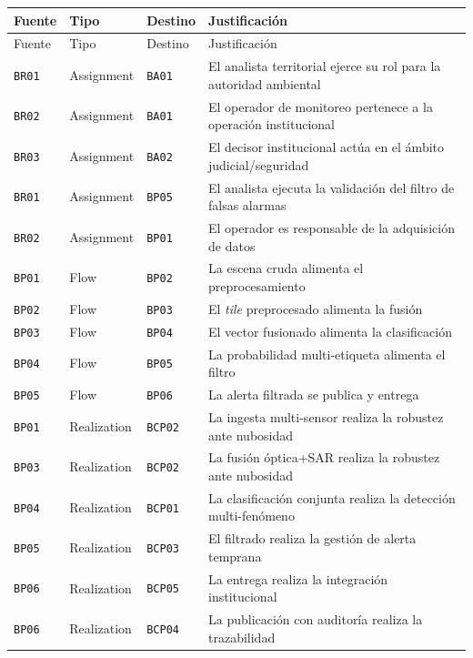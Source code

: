 \documentclass{article}
\begin{document}
{\small
\begin{longtable}{@{}L{0.45in}L{0.82in}L{0.53in}L{4.14in}@{}}
\toprule
Fuente & Tipo & Destino & Justificación \\
\midrule
\endfirsthead
\toprule
Fuente & Tipo & Destino & Justificación \\
\midrule
\endhead
\bottomrule
\endlastfoot
\texttt{BR01} & Assignment & \texttt{BA01} & El analista territorial ejerce su rol para la autoridad ambiental \\
\texttt{BR02} & Assignment & \texttt{BA01} & El operador de monitoreo pertenece a la operación institucional \\
\texttt{BR03} & Assignment & \texttt{BA02} & El decisor institucional actúa en el ámbito judicial/seguridad \\
\texttt{BR01} & Assignment & \texttt{BP05} & El analista ejecuta la validación del filtro de falsas alarmas \\
\texttt{BR02} & Assignment & \texttt{BP01} & El operador es responsable de la adquisición de datos \\
\texttt{BP01} & Flow & \texttt{BP02} & La escena cruda alimenta el preprocesamiento \\
\texttt{BP02} & Flow & \texttt{BP03} & El \emph{tile} preprocesado alimenta la fusión \\
\texttt{BP03} & Flow & \texttt{BP04} & El vector fusionado alimenta la clasificación \\
\texttt{BP04} & Flow & \texttt{BP05} & La probabilidad multi-etiqueta alimenta el filtro \\
\texttt{BP05} & Flow & \texttt{BP06} & La alerta filtrada se publica y entrega \\
\texttt{BP01} & Realization & \texttt{BCP02} & La ingesta multi-sensor realiza la robustez ante nubosidad \\
\texttt{BP03} & Realization & \texttt{BCP02} & La fusión óptica+SAR realiza la robustez ante nubosidad \\
\texttt{BP04} & Realization & \texttt{BCP01} & La clasificación conjunta realiza la detección multi-fenómeno \\
\texttt{BP05} & Realization & \texttt{BCP03} & El filtrado realiza la gestión de alerta temprana \\
\texttt{BP06} & Realization & \texttt{BCP05} & La entrega realiza la integración institucional \\
\texttt{BP06} & Realization & \texttt{BCP04} & La publicación con auditoría realiza la trazabilidad \\
\end{longtable}
}
\end{document}
